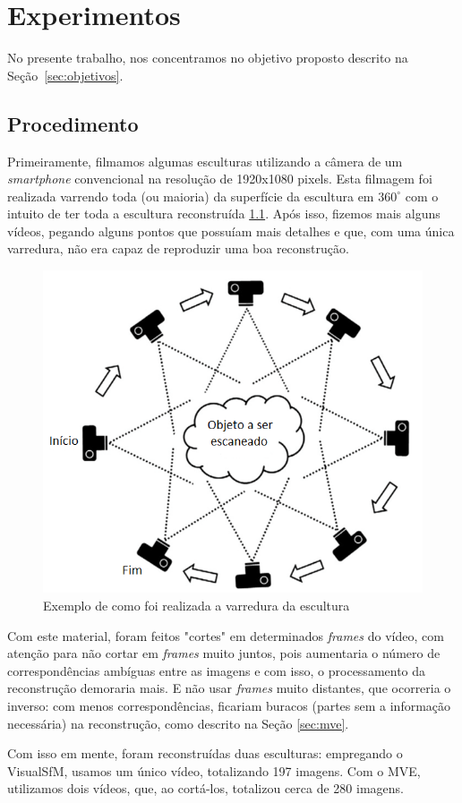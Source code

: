\chapter{Experimentos}\label{sec:experiments}
No presente trabalho, nos concentramos no objetivo proposto descrito na Seção~\ref{sec:objetivos}.

\section{Procedimento}
Primeiramente, filmamos algumas esculturas utilizando a câmera de um \emph{smartphone} convencional na resolução de 1920x1080 pixels. Esta filmagem foi realizada varrendo toda (ou maioria) da superfície da escultura em $360^{\circ}$ com o intuito de ter toda a escultura reconstruída \ref{fig:procedimentoscan}.
Após isso, fizemos mais alguns vídeos, pegando alguns pontos que possuíam mais detalhes e que, com uma única varredura, não era capaz de reproduzir uma boa reconstrução.

\begin{figure}[!h]
	\centering
	\includegraphics[width=0.4\linewidth]{figs/procedimentoscan.png}
	\caption{%
	Exemplo de como foi realizada a varredura da escultura
	}\label{fig:procedimentoscan}
\end{figure}

Com este material, foram feitos "cortes" em determinados \emph{frames} do vídeo, com atenção para não cortar em \emph{frames} muito juntos, pois aumentaria o número de correspondências ambíguas entre as imagens e com isso, o processamento da reconstrução demoraria mais. E não usar \emph{frames} muito distantes, que ocorreria o inverso: com menos correspondências, ficariam buracos (partes sem a informação necessária) na reconstrução, como descrito na Seção \ref{sec:mve}.

Com isso em mente, foram reconstruídas duas esculturas: empregando o VisualSfM, usamos um único vídeo, totalizando 197 imagens. %
Com o MVE, utilizamos dois vídeos, que, ao cortá-los, totalizou cerca de 280 imagens. %

